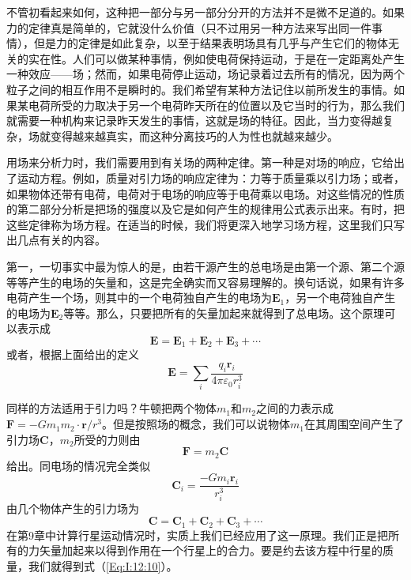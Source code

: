 不管初看起来如何，这种把一部分与另一部分分开的方法并不是微不足道的。如果力的定律真是简单的，它就没什么价值（只不过用另一种方法来写出同一件事情），但是力的定律是如此复杂，以至于结果表明场具有几乎与产生它们的物体无关的实在性。人们可以做某种事情，例如使电荷保持运动，于是在一定距离处产生一种效应——场；然而，如果电荷停止运动，场记录着过去所有的情况，因为两个粒子之间的相互作用不是瞬时的。我们希望有某种方法记住以前所发生的事情。如果某电荷所受的力取决于另一个电荷昨天所在的位置以及它当时的行为，那么我们就需要一种机构来记录昨天发生的事情，这就是场的特征。因此，当力变得越复杂，场就变得越来越真实，而这种分离技巧的人为性也就越来越少。

用场来分析力时，我们需要用到有关场的两种定律。第一种是对场的响应，它给出了运动方程。例如，质量对引力场的响应定律为：力等于质量乘以引力场；或者，如果物体还带有电荷，电荷对于电场的响应等于电荷乘以电场。对这些情况的性质的第二部分分析是把场的强度以及它是如何产生的规律用公式表示出来。有时，把这些定律称为场方程。在适当的时候，我们将更深入地学习场方程，这里我们只写出几点有关的内容。

第一，一切事实中最为惊人的是，由若干源产生的总电场是由第一个源、第二个源等等产生的电场的矢量和，这是完全确实而又容易理解的。换句话说，如果有许多电荷产生一个场，则其中的一个电荷独自产生的电场为$\boldsymbol{E}_1$，另一个电荷独自产生的电场为$\boldsymbol{E}_2$等等。那么，只要把所有的矢量加起来就得到了总电场。这个原理可以表示成
\begin{equation}
    \label{Eq:I:12:6}
    \boldsymbol{E}=\boldsymbol{E}_1+\boldsymbol{E}_2+\boldsymbol{E}_3+\cdots
\end{equation}
或者，根据上面给出的定义
\begin{equation}
    \label{Eq:I:12:7}
    \boldsymbol{E}=\sum_{i} \frac{q_i \boldsymbol{r}_i}{4\pi \varepsilon_0 r_i^3}
\end{equation}

同样的方法适用于引力吗？牛顿把两个物体$m_1$和$m_2$之间的力表示成$\boldsymbol{F}=-Gm_1m_2 \cdot \boldsymbol{r}/r^3$。但是按照场的概念，我们可以说物体$m_1$在其周围空间产生了引力场$\boldsymbol{C}$，$m_2$所受的力则由
\begin{equation}
    \label{Eq:I:12:8}
    \boldsymbol{F}=m_2\boldsymbol{C}
\end{equation}
给出。同电场的情况完全类似
\begin{equation}
    \label{Eq:I:12:9}
    \boldsymbol{C}_i=\frac{-Gm_i\boldsymbol{r}_i}{r_i^3}
\end{equation}
由几个物体产生的引力场为
\begin{equation}
    \label{Eq:I:12:10}
    \boldsymbol{C}=\boldsymbol{C}_1+\boldsymbol{C}_2+\boldsymbol{C}_3+\cdots
\end{equation}
在第9章中计算行星运动情况时，实质上我们已经应用了这一原理。我们正是把所有的力矢量加起来以得到作用在一个行星上的合力。要是约去该方程中行星的质量，我们就得到式（\ref{Eq:I:12:10}）。

